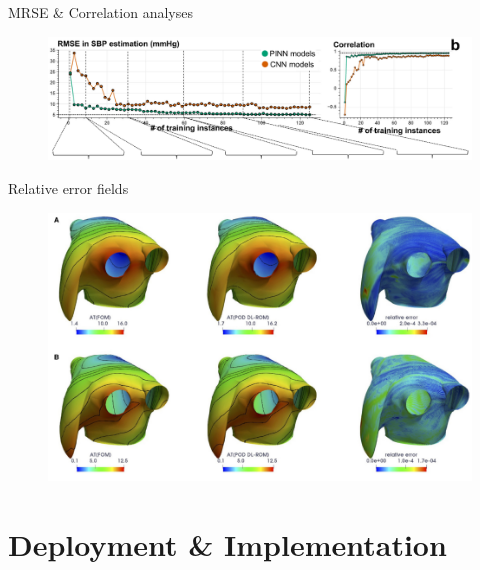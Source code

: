 \documentclass{beamer}
\begin{document}
\begin{frame}{MRSE \& Correlation analyses}
  
  \begin{figure}
      \centering
      \includegraphics[width=1\linewidth]{images/MRSE.png}
      \caption{\textcite{jafari2022}}
  \end{figure}

\end{frame}

\begin{frame}{Relative error fields}
  
  \begin{figure}
      \centering
      \includegraphics[width=0.7\linewidth]{images/err-fields.png}
      \caption{\textcite{Fresca2021}}
  \end{figure}

\end{frame}

\section{Deployment \& Implementation}
\end{document}
